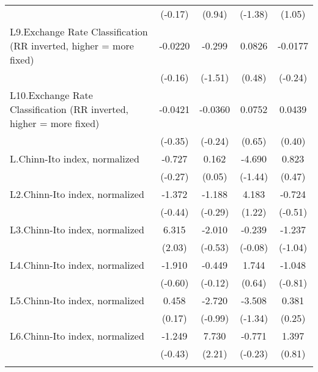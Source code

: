{\begin{longtable}{l*{4}{c}}
                &  (-0.17)         &   (0.94)         &  (-1.38)         &   (1.05)         \\
\addlinespace
L9.Exchange Rate Classification (RR inverted, higher = more fixed)&  -0.0220         &   -0.299         &   0.0826         &  -0.0177         \\
                &  (-0.16)         &  (-1.51)         &   (0.48)         &  (-0.24)         \\
\addlinespace
L10.Exchange Rate Classification (RR inverted, higher = more fixed)&  -0.0421         &  -0.0360         &   0.0752         &   0.0439         \\
                &  (-0.35)         &  (-0.24)         &   (0.65)         &   (0.40)         \\
\addlinespace
L.Chinn-Ito index, normalized&   -0.727         &    0.162         &   -4.690         &    0.823         \\
                &  (-0.27)         &   (0.05)         &  (-1.44)         &   (0.47)         \\
\addlinespace
L2.Chinn-Ito index, normalized&   -1.372         &   -1.188         &    4.183         &   -0.724         \\
                &  (-0.44)         &  (-0.29)         &   (1.22)         &  (-0.51)         \\
\addlinespace
L3.Chinn-Ito index, normalized&    6.315\sym{*}  &   -2.010         &   -0.239         &   -1.237         \\
                &   (2.03)         &  (-0.53)         &  (-0.08)         &  (-1.04)         \\
\addlinespace
L4.Chinn-Ito index, normalized&   -1.910         &   -0.449         &    1.744         &   -1.048         \\
                &  (-0.60)         &  (-0.12)         &   (0.64)         &  (-0.81)         \\
\addlinespace
L5.Chinn-Ito index, normalized&    0.458         &   -2.720         &   -3.508         &    0.381         \\
                &   (0.17)         &  (-0.99)         &  (-1.34)         &   (0.25)         \\
\addlinespace
L6.Chinn-Ito index, normalized&   -1.249         &    7.730\sym{*}  &   -0.771         &    1.397         \\
                &  (-0.43)         &   (2.21)         &  (-0.23)         &   (0.81)         \\
\addlinespace

\end{longtable}}

